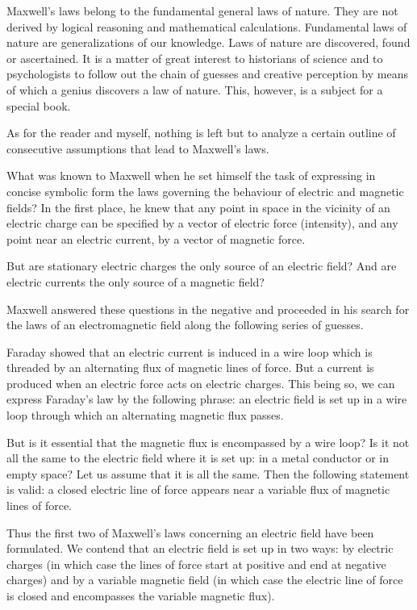 Maxwell's laws belong to the fundamental general laws of nature. They are not derived by logical reasoning and mathematical calculations. Fundamental laws of nature are generalizations of our knowledge. Laws of nature are discovered, found or ascertained. It is a matter of great interest to historians of science and to psychologists to follow out the chain of guesses and creative perception by means of which a genius discovers a law of nature. This, however, is a subject for a special book.

As for the reader and myself, nothing is left but to analyze a certain outline of consecutive assumptions that lead to Maxwell's laws.

What was known to Maxwell when he set himself the task of expressing in concise symbolic form the laws governing the behaviour of electric and magnetic fields? In the first place, he knew that any point in space in the vicinity of an electric charge can be specified by a vector of electric force (intensity), and any point near an electric current, by a vector of magnetic force.

But are stationary electric charges the only source of an electric field? And are electric currents the only source of a magnetic field?

Maxwell answered these questions in the negative and proceeded in his search for the laws of an electromagnetic field along the following series of guesses.

Faraday showed that an electric current is induced in a wire loop which is threaded by an alternating flux of magnetic lines of force. But a current is produced when an electric force acts on electric charges. This being so, we can express Faraday's law by the following phrase: an electric field is set up in a wire loop through which an alternating magnetic flux passes.

But is it essential that the magnetic flux is encompassed by a wire loop? Is it not all the same to the electric field where it is set up: in a metal conductor or in empty space? Let us assume that it is all the same. Then the following statement is valid: a closed electric line of force appears near a variable flux of magnetic lines of force.

Thus the first two of Maxwell's laws concerning an electric field have been formulated. We contend that an electric field is set up in two ways: by electric charges (in which case the lines of force start at positive and end at negative charges) and by a variable magnetic field (in which case the electric line of force is closed and encompasses the variable magnetic flux).


